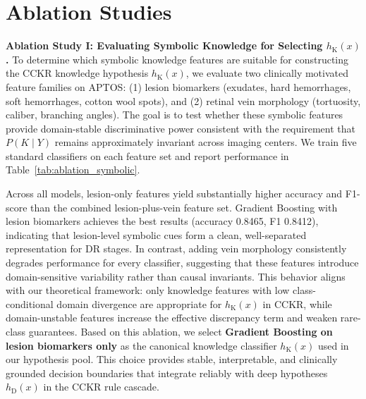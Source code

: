 \documentclass{article}
\begin{document}
\section{Ablation Studies}

\label{ablation_study1}
\textbf{Ablation Study I: Evaluating Symbolic Knowledge for Selecting $h_{\mathrm{K}}(x)$.}
To determine which symbolic knowledge features are suitable for constructing the CCKR knowledge hypothesis $h_{\mathrm{K}}(x)$, we evaluate two clinically motivated feature families on APTOS:
(1) lesion biomarkers (exudates, hard hemorrhages, soft hemorrhages, cotton wool spots), and
(2) retinal vein morphology (tortuosity, caliber, branching angles).
The goal is to test whether these symbolic features provide domain-stable discriminative power consistent with the requirement that $P(K \mid Y)$ remains approximately invariant across imaging centers.
We train five standard classifiers on each feature set and report performance in Table~\ref{tab:ablation_symbolic}.

Across all models, lesion-only features yield substantially higher accuracy and F1-score than the combined lesion-plus-vein feature set.
Gradient Boosting with lesion biomarkers achieves the best results (accuracy 0.8465, F1 0.8412), indicating that lesion-level symbolic cues form a clean, well-separated representation for DR stages.
In contrast, adding vein morphology consistently degrades performance for every classifier, suggesting that these features introduce domain-sensitive variability rather than causal invariants.
This behavior aligns with our theoretical framework: only knowledge features with low class-conditional domain divergence are appropriate for $h_{\mathrm{K}}(x)$ in CCKR, while domain-unstable features increase the effective discrepancy term and weaken rare-class guarantees.
Based on this ablation, we select \textbf{Gradient Boosting on lesion biomarkers only} as the canonical knowledge classifier $h_{\mathrm{K}}(x)$ used in our hypothesis pool.
This choice provides stable, interpretable, and clinically grounded decision boundaries that integrate reliably with deep hypotheses $h_{\mathrm{D}}(x)$ in the CCKR rule cascade.
\end{document}
